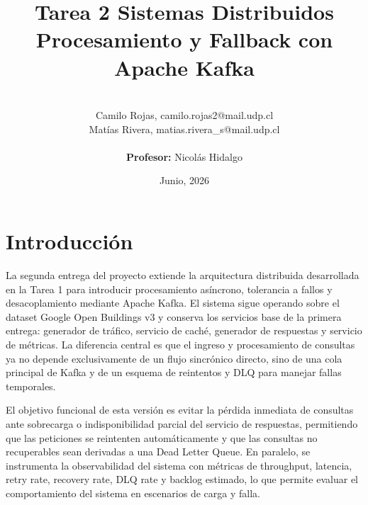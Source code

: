 \documentclass[letter,12pt]{article}
\begin{document}
\title{\Huge{Tarea 2 Sistemas Distribuidos} \\
\large Procesamiento y Fallback con Apache Kafka}
\author{\\Camilo Rojas, camilo.rojas2@mail.udp.cl\\Mat\'ias Rivera, matias.rivera\_s@mail.udp.cl \\ \\ \textbf{Profesor: } Nicol\'as Hidalgo}
\date{Junio, 2026}
\maketitle

\tableofcontents
\newpage

\section{Introducci\'on}
La segunda entrega del proyecto extiende la arquitectura distribuida desarrollada en la Tarea 1 para introducir procesamiento as\'incrono, tolerancia a fallos y desacoplamiento mediante Apache Kafka. El sistema sigue operando sobre el dataset Google Open Buildings v3 y conserva los servicios base de la primera entrega: generador de tr\'afico, servicio de cach\'e, generador de respuestas y servicio de m\'etricas. La diferencia central es que el ingreso y procesamiento de consultas ya no depende exclusivamente de un flujo sincr\'onico directo, sino de una cola principal de Kafka y de un esquema de reintentos y DLQ para manejar fallas temporales.

El objetivo funcional de esta versi\'on es evitar la p\'erdida inmediata de consultas ante sobrecarga o indisponibilidad parcial del servicio de respuestas, permitiendo que las peticiones se reintenten autom\'aticamente y que las consultas no recuperables sean derivadas a una Dead Letter Queue. En paralelo, se instrumenta la observabilidad del sistema con m\'etricas de throughput, latencia, retry rate, recovery rate, DLQ rate y backlog estimado, lo que permite evaluar el comportamiento del sistema en escenarios de carga y falla.
\end{document}
